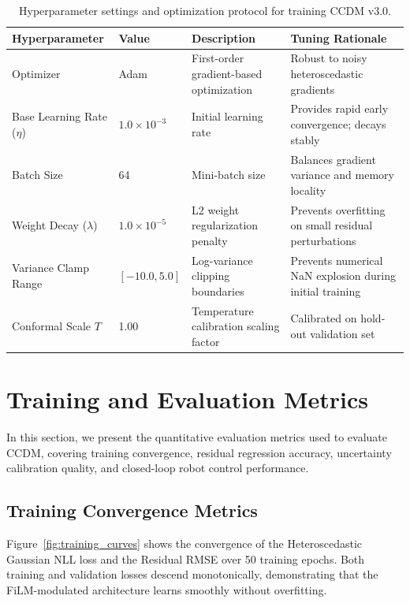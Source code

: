 \documentclass[10pt,a4paper]{article}
\begin{document}
\begin{table}[h]
\centering
\small
\begin{tabularx}{\linewidth}{p{3.2cm}p{2.0cm}p{4.2cm}X}
\toprule
\textbf{Hyperparameter} & \textbf{Value} & \textbf{Description} & \textbf{Tuning Rationale} \\
\midrule
Optimizer & Adam & First-order gradient-based optimization & Robust to noisy heteroscedastic gradients \\
Base Learning Rate ($\eta$) & $1.0 \times 10^{-3}$ & Initial learning rate & Provides rapid early convergence; decays stably \\
Batch Size & 64 & Mini-batch size & Balances gradient variance and memory locality \\
Weight Decay ($\lambda$) & $1.0 \times 10^{-5}$ & L2 weight regularization penalty & Prevents overfitting on small residual perturbations \\
Variance Clamp Range & $[-10.0, 5.0]$ & Log-variance clipping boundaries & Prevents numerical NaN explosion during initial training \\
Conformal Scale $T$ & 1.00 & Temperature calibration scaling factor & Calibrated on hold-out validation set \\
\bottomrule
\end{tabularx}
\caption{Hyperparameter settings and optimization protocol for training CCDM v3.0.}
\label{tab:hyperparameters}
\end{table}

\newpage

\section{Training and Evaluation Metrics}
In this section, we present the quantitative evaluation metrics used to evaluate CCDM, covering training convergence, residual regression accuracy, uncertainty calibration quality, and closed-loop robot control performance.

\subsection{Training Convergence Metrics}
Figure~\ref{fig:training_curves} shows the convergence of the Heteroscedastic Gaussian NLL loss and the Residual RMSE over 50 training epochs. Both training and validation losses descend monotonically, demonstrating that the FiLM-modulated architecture learns smoothly without overfitting.
\end{document}
